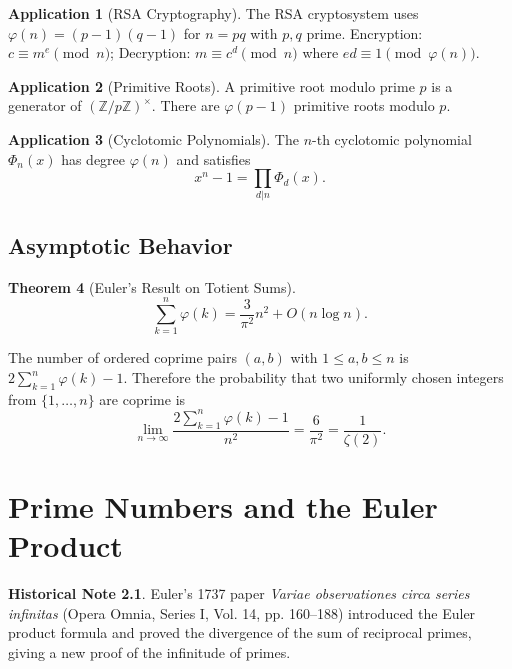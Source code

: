 \documentclass[11pt,a4paper,twoside]{book}
\theoremstyle{eulerstyle}
\newtheorem{theorem}{Theorem}[chapter]
\theoremstyle{definition}
\newtheorem{historical}[theorem]{Historical Note}
\newtheorem{application}[theorem]{Application}
\newcommand{\Z}{\mathbb{Z}}
\begin{document}
\begin{application}[RSA Cryptography]
The RSA cryptosystem uses $\varphi(n) = (p-1)(q-1)$ for $n=pq$ with $p,q$ prime. 
Encryption: $c \equiv m^e \pmod{n}$; Decryption: $m \equiv c^d \pmod{n}$ where $ed \equiv 1 \pmod{\varphi(n)}$.
\end{application}

\begin{application}[Primitive Roots]
A primitive root modulo prime $p$ is a generator of $(\Z/p\Z)^\times$. There are $\varphi(p-1)$ primitive roots modulo $p$.
\end{application}

\begin{application}[Cyclotomic Polynomials]
The $n$-th cyclotomic polynomial $\Phi_n(x)$ has degree $\varphi(n)$ and satisfies
\[
x^n - 1 = \prod_{d|n} \Phi_d(x).
\]
\end{application}

\section{Asymptotic Behavior}

\begin{theorem}[Euler's Result on Totient Sums]
\[
\sum_{k=1}^n \varphi(k) = \frac{3}{\pi^2} n^2 + O(n \log n).
\]
\end{theorem}

The number of ordered coprime pairs $(a,b)$ with $1\le a,b\le n$ is
$2\sum_{k=1}^n\varphi(k)-1$. Therefore the probability that two uniformly
chosen integers from $\{1,\dots,n\}$ are coprime is
\[
\lim_{n \to \infty} \frac{2\sum_{k=1}^n\varphi(k)-1}{n^2}
= \frac{6}{\pi^2} = \frac{1}{\zeta(2)}.
\]

\cleardoublepage

\chapter{Prime Numbers and the Euler Product}
\label{ch:primes}

\begin{historical}
Euler's 1737 paper \emph{Variae observationes circa series infinitas} (Opera Omnia, Series I, Vol. 14, pp. 160--188) introduced the Euler product formula and proved the divergence of the sum of reciprocal primes, giving a new proof of the infinitude of primes. \cite{euler1737}\end{historical}
\end{document}

